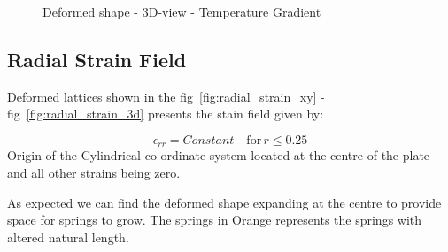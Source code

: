\begin{figure}[!htbp]
\begin{minipage}{0.3\textwidth}
    \caption{Deformed shape - 3D-view - Temperature Gradient}
    \label{fig:temp_grad_3d}
\end{minipage}
\end{figure}

\subsection{Radial Strain Field}
Deformed lattices shown in the fig~\ref{fig:radial_strain_xy} - fig~\ref{fig:radial_strain_3d} presents the stain field given by:

\begin{equation}
    \epsilon_{rr} = Constant \quad \textrm{for} \, r\leq 0.25
\end{equation}
Origin of the Cylindrical co-ordinate system located at the centre of the plate and all other strains being zero.

As expected we can find the deformed shape expanding at the centre to provide space for springs to grow. The springs in Orange represents the springs with altered natural length.

